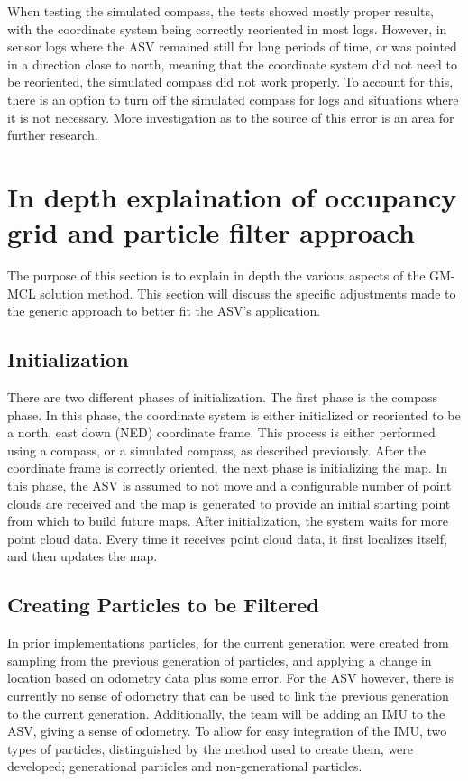 \documentclass[10pt]{IEEEtran}
\begin{document}
When testing the simulated compass, the tests showed mostly proper results, with the 
coordinate system being correctly reoriented in most logs.  However, in sensor logs where 
the ASV remained still for long periods of time, or was pointed in a direction close to 
north, meaning that the coordinate system did not need to be reoriented, the simulated
compass did not work properly.  To account for this,
there is an option to turn off the simulated
compass for logs and situations where it is not necessary.  More 
investigation as to the source of this error is an area for further research.

\section{In depth explaination of occupancy grid and particle filter approach}
The purpose of this section is to explain in depth the various aspects of the GM-MCL
solution method.  This section will discuss the specific adjustments made to the generic
approach to better fit the ASV's application.

\subsection{Initialization}
There are two different phases of initialization.  The first phase is the compass phase.
In this phase, the coordinate system is either initialized or reoriented to be a north, east
down (NED) coordinate frame.  This process is either performed using a compass, or
a simulated compass, as described previously.  After the coordinate frame is correctly
oriented, the next phase is initializing the map.  In this phase, the ASV is assumed to not
move and a configurable number of point clouds are received and the map is generated to
provide an initial starting point from which to build future maps.  After initialization,
the system waits for more point cloud data.  Every time it receives point cloud data, 
it first localizes itself, and then updates the map.


\subsection{Creating Particles to be Filtered}
In prior implementations particles, for the current generation were created from sampling from
the previous generation of particles, and applying a change in location based on odometry 
data plus some error.  For the ASV however, there is currently no sense of odometry that 
can be used to link the previous generation to the current generation.  Additionally, the 
team will be adding an IMU to the ASV, giving a sense of odometry.  To allow for easy 
integration of the IMU, two types of particles, distinguished by the method used to create
them, were developed; generational particles and non-generational particles.
\end{document}
